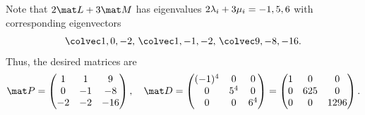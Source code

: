 \begin{solution}
    Note that $2\mat L + 3\mat M$ has eigenvalues $2\lambda_i + 3\mu_i = -1, 5, 6$ with corresponding eigenvectors \[\cveciii10{-2}, \, \cveciii1{-1}{-2}, \, \cveciii9{-8}{-16}.\] Thus, the desired matrices are \[\mat P = \begin{pmatrix}1 & 1 & 9 \\ 0 & -1 & -8 \\ -2 & -2 & -16\end{pmatrix}, \quad \mat D = \begin{pmatrix}(-1)^4 & 0 & 0 \\ 0 & 5^4 & 0 \\ 0 & 0 & 6^4\end{pmatrix} = \begin{pmatrix}1 & 0 & 0 \\ 0 & 625 & 0 \\ 0 & 0 & 1296\end{pmatrix}.\]
\end{solution}

